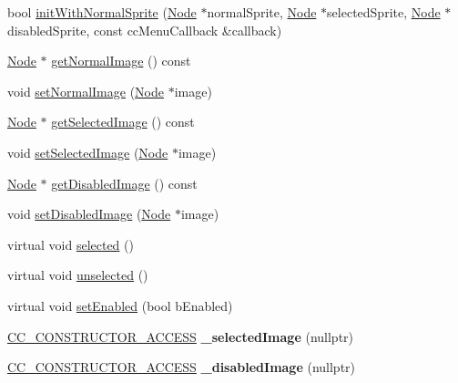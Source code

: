 \begin{DoxyCompactItemize}
\item 
bool \hyperlink{classMenuItemSprite_a2cbb85645b77b5e6a356212dea870ad2}{init\+With\+Normal\+Sprite} (\hyperlink{classNode}{Node} $\ast$normal\+Sprite, \hyperlink{classNode}{Node} $\ast$selected\+Sprite, \hyperlink{classNode}{Node} $\ast$disabled\+Sprite, const cc\+Menu\+Callback \&callback)
\item 
\hyperlink{classNode}{Node} $\ast$ \hyperlink{classMenuItemSprite_a58e62e7a8c9255d7dddaf1e868637aa3}{get\+Normal\+Image} () const
\item 
void \hyperlink{classMenuItemSprite_a27ddb3eec072386e1e34034c185a3b45}{set\+Normal\+Image} (\hyperlink{classNode}{Node} $\ast$image)
\item 
\hyperlink{classNode}{Node} $\ast$ \hyperlink{classMenuItemSprite_ae5a5bdcfe21ab32a531633ea2c4275a1}{get\+Selected\+Image} () const
\item 
void \hyperlink{classMenuItemSprite_adc05f4e00100f4d526786709b9294ad6}{set\+Selected\+Image} (\hyperlink{classNode}{Node} $\ast$image)
\item 
\hyperlink{classNode}{Node} $\ast$ \hyperlink{classMenuItemSprite_a9db9e0e79bfc17d27f697a69b023b0c5}{get\+Disabled\+Image} () const
\item 
void \hyperlink{classMenuItemSprite_ac93922466d23b5ae32c6da4ccb4bdd62}{set\+Disabled\+Image} (\hyperlink{classNode}{Node} $\ast$image)
\item 
virtual void \hyperlink{classMenuItemSprite_ab48a29704c139512abfb0835fecfa087}{selected} ()
\item 
virtual void \hyperlink{classMenuItemSprite_a22671f2793757b6e4a528dd8bb393fe1}{unselected} ()
\item 
virtual void \hyperlink{classMenuItemSprite_ae64b755275632b2c8f4bae41a6b23287}{set\+Enabled} (bool b\+Enabled)
\item 
\mbox{\label{classMenuItemSprite_ac5ffc0f3fea363ca5783759ac346b9cc}} 
\hyperlink{_2cocos2d_2cocos_2base_2ccConfig_8h_a25ef1314f97c35a2ed3d029b0ead6da0}{C\+C\+\_\+\+C\+O\+N\+S\+T\+R\+U\+C\+T\+O\+R\+\_\+\+A\+C\+C\+E\+SS} {\bfseries \+\_\+selected\+Image} (nullptr)
\item 
\mbox{\label{classMenuItemSprite_af79057c9ff34d0baf272ad6399e0a578}} 
\hyperlink{_2cocos2d_2cocos_2base_2ccConfig_8h_a25ef1314f97c35a2ed3d029b0ead6da0}{C\+C\+\_\+\+C\+O\+N\+S\+T\+R\+U\+C\+T\+O\+R\+\_\+\+A\+C\+C\+E\+SS} {\bfseries \+\_\+disabled\+Image} (nullptr)

\end{DoxyCompactItemize}
